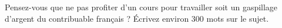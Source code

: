 
\begin{exercice}\label{exosmath-0442}

    Pensez-vous que ne pas profiter d'un cours pour travailler soit un gaspillage d'argent du contribuable français ? Écrivez environ \( 300\) mots sur le sujet.

\end{exercice}
